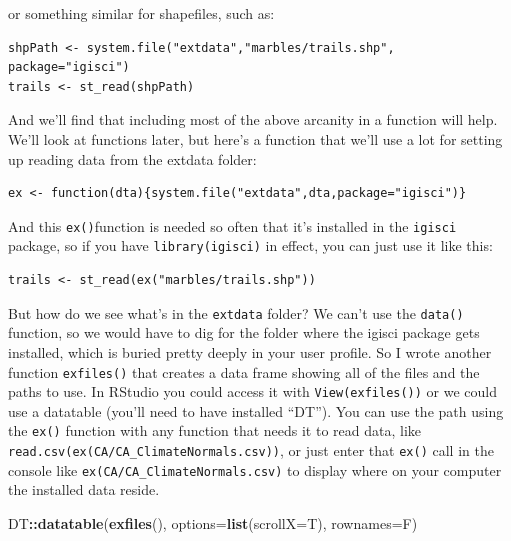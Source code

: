 \documentclass[
]{book}
\newenvironment{Shaded}{\begin{snugshade}}{\end{snugshade}}
\newcommand{\AttributeTok}[1]{\textcolor[rgb]{0.27,0.27,0.27}{#1}}
\newcommand{\FunctionTok}[1]{\textcolor[rgb]{0.27,0.27,0.27}{\textbf{#1}}}
\newcommand{\NormalTok}[1]{#1}
\newcommand{\SpecialCharTok}[1]{\textcolor[rgb]{0.43,0.43,0.43}{\textbf{#1}}}
\begin{document}
or something similar for shapefiles, such as:

\begin{verbatim}
shpPath <- system.file("extdata","marbles/trails.shp", package="igisci")
trails <- st_read(shpPath)
\end{verbatim}

And we'll find that including most of the above arcanity in a function will help. We'll look at functions later, but here's a function that we'll use a lot for setting up reading data from the extdata folder:

\begin{verbatim}
ex <- function(dta){system.file("extdata",dta,package="igisci")}
\end{verbatim}

And this \texttt{ex()}function is needed so often that it's installed in the \texttt{igisci} package, so if you have \texttt{library(igisci)} in effect, you can just use it like this:

\begin{verbatim}
trails <- st_read(ex("marbles/trails.shp"))
\end{verbatim}

But how do we see what's in the \texttt{extdata} folder? We can't use the \texttt{data()} function, so we would have to dig for the folder where the igisci package gets installed, which is buried pretty deeply in your user profile. So I wrote another function \texttt{exfiles()} that creates a data frame showing all of the files and the paths to use. In RStudio you could access it with \texttt{View(exfiles())} or we could use a datatable (you'll need to have installed ``DT''). You can use the path using the \texttt{ex()} function with any function that needs it to read data, like \texttt{read.csv(ex(\textquotesingle{}CA/CA\_ClimateNormals.csv\textquotesingle{}))}, or just enter that \texttt{ex()} call in the console like \texttt{ex(\textquotesingle{}CA/CA\_ClimateNormals.csv\textquotesingle{})} to display where on your computer the installed data reside.

\begin{Shaded}
\begin{Highlighting}[]
\NormalTok{DT}\SpecialCharTok{::}\FunctionTok{datatable}\NormalTok{(}\FunctionTok{exfiles}\NormalTok{(), }\AttributeTok{options=}\FunctionTok{list}\NormalTok{(}\AttributeTok{scrollX=}\NormalTok{T), }\AttributeTok{rownames=}\NormalTok{F)}
\end{Highlighting}
\end{Shaded}
\end{document}
